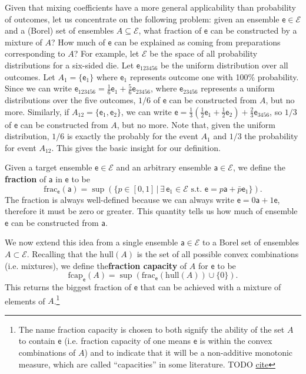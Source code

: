 \documentclass[10pt,twocolumn, nofootinbib]{revtex4-2}
\newcommand\hull{\mathrm{hull}}
\newcommand\fraction{\mathrm{frac}}
\newcommand\frcap{\mathrm{fcap}}
\newcommand{\ens}[1][e] {\mathsf{#1}} %
\newcommand{\Ens}[1][E] {\mathcal{#1}} %
\begin{document}
Given that mixing coefficients have a more general applicability than probability of outcomes, let us concentrate on the following problem: given an ensemble $\ens \in \Ens$ and a (Borel) set of ensembles $A \subseteq \Ens$, what fraction of $\ens$ can be constructed by a mixture of $A$? How much of $\ens$ can be explained as coming from preparations corresponding to $A$? For example, let $\Ens$ be the space of all probability distributions for a six-sided die. Let $\ens_{123456}$ be the uniform distribution over all outcomes. Let $A_1 = \{\ens_1\}$ where $\ens_1$ represents outcome one with 100\% probability. Since we can write $\ens_{123456} = \frac{1}{6} \ens_{1} + \frac{5}{6} \ens_{23456}$, where $\ens_{23456}$ represents a uniform distributions over the five outcomes, $1/6$ of $\ens$ can be constructed from $A$, but no more. Similarly, if $A_{12} = \{\ens_{1},\ens_{2}\}$, we can write $\ens = \frac{1}{3} \left(\frac{1}{2} \ens_1 + \frac{1}{2} \ens_2 \right)  + \frac{2}{3} \ens_{3456}$, so $1/3$ of $\ens$ can be constructed from $A$, but no more. Note that, given the uniform distribution, $1/6$ is exactly the probably for the event $A_1$ and $1/3$ the probability for event $A_{12}$. This gives the basic insight for our definition.

Given a target ensemble $\ens \in \Ens$ and an arbitrary ensemble $\ens[a] \in \Ens$, we define the \textbf{fraction} of $\ens[a]$ in $\ens$ to be
\begin{equation}
	\fraction_{\ens}(\ens[a]) = \sup(\{ p \in [0,1] \, | \, \exists \, \ens_1 \in \Ens \text{ s.t. }  \ens = p \ens[a] + \bar{p} \ens_1 \}).
\end{equation}
The fraction is always well-defined because we can always write $\ens = 0 \ens[a] + 1 \ens$, therefore it must be zero or greater. This quantity tells us how much of ensemble $\ens$ can be constructed from $\ens[a]$. 

We now extend this idea from a single ensemble $\ens[a] \in \Ens$ to a Borel set of ensembles $A \subset \Ens$. Recalling that the $\hull(A)$ is the set of all possible convex combinations (i.e. mixtures), we define the\textbf{fraction capacity} of $A$ for $\ens$ to be
\begin{equation}
	\frcap_{\ens}(A) = \sup(\fraction_{\ens}(\hull(A))\cup\{0\}).
\end{equation}
This returns the biggest fraction of $\ens$ that can be achieved with a mixture of elements of $A$.\footnote{The name fraction capacity is chosen to both signify the ability of the set $A$ to contain $\ens$ (i.e. fraction capacity of one means $\ens$ is within the convex combinations of $A$) and to indicate that it will be a non-additive monotonic measure, which are called ``capacities'' in some literature. TODO \href{ https://link.springer.com/book/10.1007/978-3-319-03155-2}{cite} }
\end{document}

